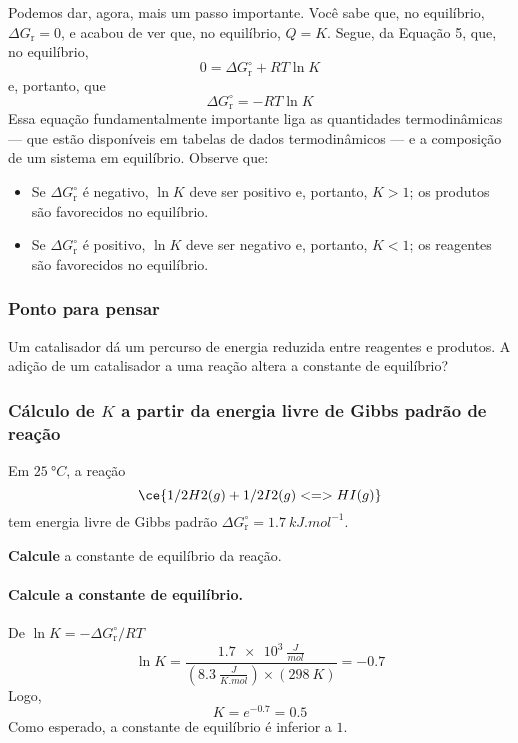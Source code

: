 Podemos dar, agora, mais um passo importante. Você sabe que, no equilíbrio, \(\Delta G_\mathrm{r} = 0\), e acabou de ver que, no equilíbrio,
\(Q = K\). Segue, da Equação 5, que, no equilíbrio, \[
    0 = \Delta G_\mathrm{r}^\circ + RT \ln K
\] e, portanto, que \[
    \Delta G_\mathrm{r}^\circ = -RT \ln K
\tag{7}
\] Essa equação fundamentalmente importante liga as quantidades termodinâmicas --- que estão disponíveis em tabelas de dados termodinâmicos --- e a
composição de um sistema em equilíbrio. Observe que:

\begin{itemize}
\tightlist
\item
  Se \(\Delta G_\mathrm{r}^\circ\) é negativo, \(\ln K\) deve ser positivo e, portanto, \(K > 1\); os produtos são favorecidos no equilíbrio.
\item
  Se \(\Delta G_\mathrm{r}^\circ\) é positivo, \(\ln K\) deve ser negativo e, portanto, \(K < 1\); os reagentes são favorecidos no equilíbrio.
\end{itemize}

\begin{think}

\subsubsection{Ponto para pensar}

Um catalisador dá um percurso de energia reduzida entre reagentes e produtos. A adição de um catalisador a uma reação altera a constante de
equilíbrio?

\end{think}

\begin{example}

\subsubsection{\texorpdfstring{Cálculo de \(K\) a partir da energia livre de Gibbs padrão de
reação}{Cálculo de K a partir da energia livre de Gibbs padrão de reação}}

Em \(\qty{25}{\unit{\degree C}}\), a reação \[
    \ce{ 1/2 H2(g) + 1/2 I2(g) <=> HI(g) }
\] tem energia livre de Gibbs padrão \(\Delta G_\mathrm{r}^\circ = \qty{+1,7}{\unit{kJ.mol^{-1}}}\).

\textbf{Calcule} a constante de equilíbrio da reação.

\paragraph{Calcule a constante de equilíbrio.}

De \(\ln K = - \Delta G_\mathrm{r}^\circ / RT\) \[
    \ln K = \dfrac{ \qty{1,7e3}{\tfrac{\unit{J}}{\unit{mol}}} }{ (\qty{8,3}{\tfrac{\unit{J}}{\unit{K.mol}}}) \times (\qty{298}{\unit{K}})  } = \num{-0,7}
\] Logo, \[
    K = e^{\num{-0,7}} = \boxed{ \num{0,5} }
\] Como esperado, a constante de equilíbrio é inferior a \(1\).

\end{example}

